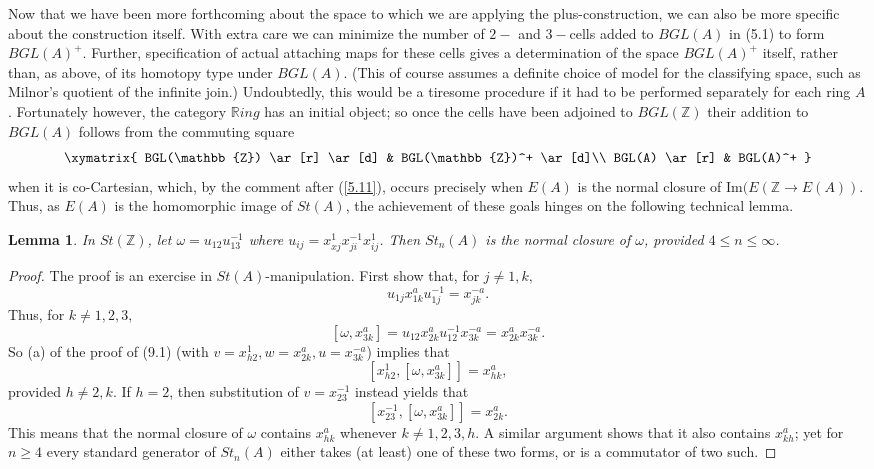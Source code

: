 \documentclass[openany,leqno]{book}  %
\newtheorem{lemma}[theorem]{Lemma}
\begin{document}
Now that we have been more forthcoming about the space to which we are applying the plus-construction, we can also be more specific about the construction itself. With extra care we can minimize the number of $2-$ and $3-$cells added to $BGL(A)$ in (5.1) to form $BGL(A)^+$. Further, specification of actual attaching maps for these cells gives a determination of the space $BGL(A)^+$ itself, rather than, as above, of its homotopy type under $BGL(A)$. (This of course assumes a definite choice of model for the classifying space, such as Milnor's quotient of the infinite join.) Undoubtedly, this would be a tiresome procedure if it had to be performed separately for each ring $A$. Fortunately however, the category $\mathbb{R}ing$ has an initial object; so once the cells have been adjoined to $BGL(\mathbb{Z})$ their addition to $BGL(A)$ follows from the commuting square
\begin{equation}
 \xymatrix{
BGL(\mathbb{Z}) \ar[r] \ar[d] & BGL(\mathbb{Z})^+ \ar[d]\\
BGL(A) \ar[r] & BGL(A)^+
} 
\end{equation}
when it is co-Cartesian, which, by the comment after (\ref{5.11}), occurs precisely when $E(A)$ is the normal closure of $\textrm{Im}(E(\mathbb{Z}\longrightarrow E(A))$. Thus, as $E(A)$ is the homomorphic image of $St(A)$, the achievement of these goals hinges on the following technical lemma.
\begin{lemma}
  In $St(\mathbb{Z})$, let $\omega=u_{12}u_{13}^{-1}$ where $u_{ij}=x_{xj}^1x_{ji}^{-1}x_{ij}^1$. Then $St_n(A)$ is the normal closure of $\omega$, provided $4\leqslant n \leqslant \infty$.
\end{lemma}
\begin{proof}
  The proof is an exercise in $St(A)$-manipulation. First show that, for $j\neq 1,k,$
  \[u_{1j}x_{1k}^au_{1j}^{-1}=x_{jk}^{-a}.\]
  Thus, for $k\neq 1,2,3,$
  \[[\omega, x_{3k}^a]=u_{12}x_{2k}^au_{12}^{-1}x_{3k}^{-a}=x_{2k}^ax_{3k}^{-a}.\]
  So (a) of the proof of (9.1) (with $v=x_{h2}^1, w=x_{2k}^a, u=x_{3k}^{-a}$) implies that
  \[[x_{h2}^1, [\omega, x_{3k}^a]]=x_{hk}^a,\]
  provided $h\neq 2,k$. If $h=2$, then substitution of $v=x_{23}^{-1}$ instead yields that
  \[[x_{23}^{-1}, [\omega, x_{3k}^a]]=x_{2k}^a.\]
  This means that the normal closure of $\omega$ contains $x_{hk}^a$ whenever $k\neq 1,2,3,h$. A similar argument shows that it also contains $x_{kh}^a$; yet for $n\geqslant 4$ every standard generator of $St_n(A)$ either takes (at least) one of these two forms, or is a commutator of two such.
\end{proof}
\end{document}
